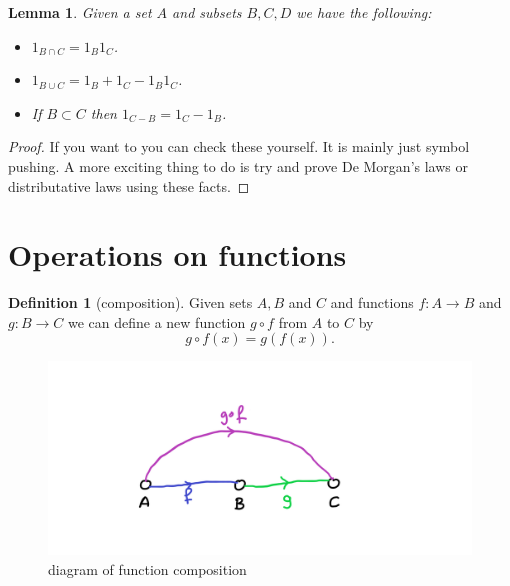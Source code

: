 \documentclass[
]{book}
\newtheorem{lemma}{Lemma}[chapter]
\theoremstyle{definition}
\newtheorem{definition}{Definition}[chapter]
\theoremstyle{definition}
\theoremstyle{definition}
\theoremstyle{definition}
\theoremstyle{remark}
\begin{document}
\begin{lemma}

Given a set \(A\) and subsets \(B, C, D\) we have the following:

\begin{itemize}
\item
  \(1_{B \cap C} = 1_{B}1_{C}\).
\item
  \(1_{B \cup C} = 1_B + 1_C - 1_B 1_C\).
\item
  If \(B \subset C\) then \(1_{C - B} = 1_C - 1_B\).
\end{itemize}

\end{lemma}

\begin{proof}
If you want to you can check these yourself. It is mainly just symbol pushing. A more exciting thing to do is try and prove De Morgan's laws or distributative laws using these facts.
\end{proof}

\section{Operations on functions}\label{operations-on-functions}

\begin{definition}[composition]

Given sets \(A, B\) and \(C\) and functions \(f: A \rightarrow B\) and \(g: B \rightarrow C\) we can define a new function \(g \circ f\) from \(A\) to \(C\) by
\[ g\circ f(x) = g(f(x)).  \]

\begin{figure}
\centering
\includegraphics{compositiondiagram.png}
\caption{\label{fig:unnamed-chunk-17}diagram of function composition}
\end{figure}

\end{definition}
\end{document}
